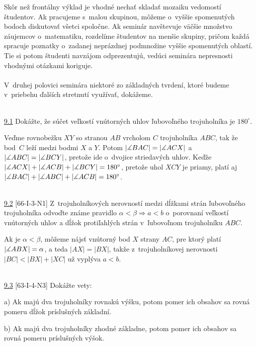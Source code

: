 \kom Skôr než frontálny výklad je vhodné nechať skladať mozaiku vedomostí študentov. Ak pracujeme s~malou skupinou, môžeme o~vyššie spomenutých bodoch diskutovať všetci spoločne. Ak seminár navštevuje väčšie množstvo záujemcov o~matematiku, rozdelíme študentov na menšie skupiny, pričom každá spracuje poznatky o~zadanej neprázdnej podmnožine vyššie spomenutých oblastí. Tie si potom študenti navzájom odprezentujú, vedúci seminára nepresnosti vhodnými otázkami koriguje. \\
\\
\kom V~druhej polovici seminára niektoré zo základných tvrdení, ktoré budeme v~priebehu ďalších stretnutí využívať, dokážeme.\\
\\
\begin{tcolorbox}[breakable,notitle,boxrule=0pt,colback=light-gray,colframe=light-gray]\ul{9.1} Dokážte, že súčet veľkostí vnútorných uhlov ľubovoľného trojuholníka je $180^\circ$.

\end{tcolorbox}

\rie Veďme rovnobežku $XY$ so stranou $AB$ vrcholom $C$ trojuholníka $ABC$, tak že bod~$C$ leží medzi bodmi $X$ a $Y$. Potom $|\measuredangle BAC|=|\measuredangle ACX|$ a $|\measuredangle ABC|=|\measuredangle BCY|$, pretože ide o~dvojice striedavých uhlov. Keďže $|\measuredangle ACX|+|\measuredangle ACB|+ |\measuredangle BCY|=180^\circ$, pretože uhol $XCY$ je priamy, platí aj $|\measuredangle BAC|+|\measuredangle ABC|+|\measuredangle ACB|=180^\circ$.\\
\\
\begin{tcolorbox}[breakable,notitle,boxrule=0pt,colback=light-gray,colframe=light-gray]\ul{9.2} [66-I-3-N1] Z~trojuholníkových nerovností medzi dĺžkami strán ľubovoľného trojuholníka odvoďte známe
pravidlo $\alpha < \beta \Rightarrow a < b$ o~porovnaní veľkostí vnútorných uhlov a dĺžok protiľahlých strán v~ľubovoľnom trojuholníku $ABC$.

\end{tcolorbox}

\rieh Ak je $\alpha  < \beta$, môžeme nájsť vnútorný bod $X$ strany $AC$, pre ktorý platí $|\measuredangle ABX| = \alpha$, a teda $|AX| = |BX|$, takže z~trojuholníkovej nerovnosti $|BC| < |BX| + |XC|$ už vyplýva $a < b$.\\
\\
\begin{tcolorbox}[breakable,notitle,boxrule=0pt,colback=light-gray,colframe=light-gray]\ul{9.3} [63-I-4-N3] Dokážte vety:

a) Ak majú dva trojuholníky rovnakú výšku, potom pomer ich obsahov sa rovná pomeru dĺžok príslušných základní.

b) Ak majú dva trojuholníky zhodné základne, potom pomer ich obsahov sa rovná pomeru príslušných výšok.

\end{tcolorbox}

